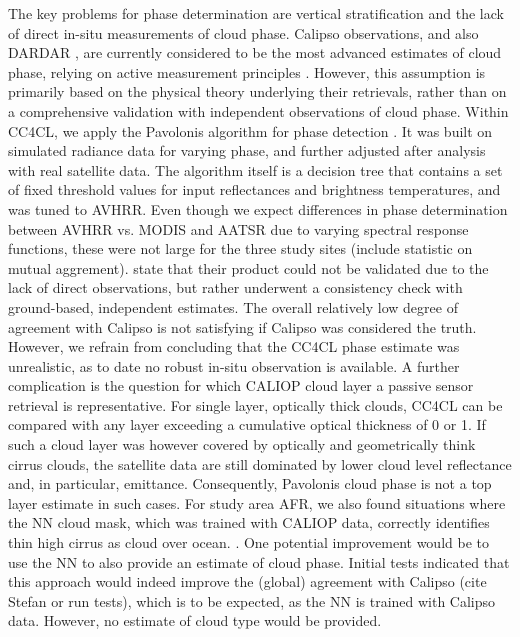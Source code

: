 The key problems for phase determination are vertical stratification and the lack of direct in-situ measurements of cloud phase. Calipso observations, and also DARDAR \citep{Ceccaldi13}, are currently considered to be the most advanced estimates of cloud phase, relying on active measurement principles \citep{Winker09,Karlsson10}. However, this assumption is primarily based on the physical theory underlying their retrievals, rather than on a comprehensive validation with independent observations of cloud phase. Within CC4CL, we apply the Pavolonis algorithm for phase detection \citep{Pavolonis05}. It was built on simulated radiance data for varying phase, and further adjusted after analysis with real satellite data. The algorithm itself is a decision tree that contains a set of fixed threshold values for input reflectances and brightness temperatures, and was tuned to AVHRR. Even though we expect differences in phase determination between AVHRR vs. MODIS and AATSR due to varying spectral response functions, these were not large for the three study sites (include statistic on mutual aggrement). \citet{Pavolonis05} state that their product could not be validated due to the lack of direct observations, but rather underwent a consistency check with ground-based, independent estimates. The overall relatively low degree of agreement with Calipso is not satisfying if Calipso was considered the truth. However, we refrain from concluding that the CC4CL phase estimate was unrealistic, as to date no robust in-situ observation is available. A further complication is the question for which CALIOP cloud layer a passive sensor retrieval is representative. For single layer, optically thick clouds, CC4CL can be compared with any layer exceeding a cumulative optical thickness of 0 or 1. If such a cloud layer was however covered by optically and geometrically think cirrus clouds, the satellite data are still dominated by lower cloud level reflectance and, in particular, emittance. Consequently, Pavolonis cloud phase is not a top layer estimate in such cases. For study area AFR, we also found situations where the NN cloud mask, which was trained with CALIOP data, correctly identifies thin high cirrus as cloud over ocean. . One potential improvement would be to use the NN to also provide an estimate of cloud phase. Initial tests indicated that this approach would indeed improve the (global) agreement with Calipso (cite Stefan or run tests), which is to be expected, as the NN is trained with Calipso data. However, no estimate of cloud type would be provided.


